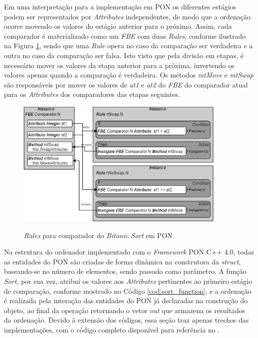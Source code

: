 Em uma interpretação para a implementação em PON os diferentes estágios podem
ser representados por \textit{Attributes} independentes, de modo que a ordenação
ocorre movendo os valores do estágio anterior para o próximo. Assim, cada
comparador é materializado como um \textit{FBE} com duas \textit{Rules},
conforme ilustrado na Figura \ref{fig:rule_bitonic}, sendo que uma \textit{Rule}
opera no caso da comparação ser verdadeira e a outra no caso da comparação ser
falsa. Isto visto que pela divisão em etapas, é necessário mover os valores da
etapa anterior para a próxima, invertendo os valores apenas quando a comparação
é verdadeira. Os métodos \textit{mtMove} e \textit{mtSwap} são responsáveis por
mover os valores de \textit{at1} e \textit{at2} do \textit{FBE} do comparador
atual para os \textit{Attributes} dos comparadores das etapas seguintes.

\begin{figure}[!htb]
\centering
\caption{\textit{Rules} para comparador do \textit{Bitonic Sort} em PON}
\includegraphics[width=0.9\textwidth]{../figures/rule_bitonic.png}
\smallskip
{}
\label{fig:rule_bitonic}
\end{figure}

\FloatBarrier

Na estrutura do ordenador implementado com o \textit{Framework} PON C++ 4.0,
todas as entidades do PON são criadas de forma dinâmica na construtora da
\textit{struct}, baseando-se no número de elementos, sendo passado como
parâmetro. A função \textit{Sort}, por sua vez, atribuí os valores aos
\textit{Attributes} pertinentes ao primeiro estágio de comparação, conforme
mostrado no Código \ref{cod:sort_function}, e a ordenação é realizada pela
interação das entidades do PON já declaradas na construção do objeto, ao final
da operação retornando o vetor \textit{out} que armazena os resultados da
ordenação. Devido à extensão dos códigos, essa seção traz apenas trechos das implementações,
com o código completo disponível para referência no .

